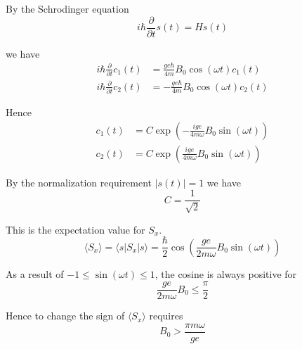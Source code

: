 By the Schrodinger equation
\begin{equation*}
i\hbar\frac{\partial}{\partial t}s(t)=Hs(t)
\end{equation*}

we have
\begin{align*}
i\hbar\frac{\partial}{\partial t}c_1(t)&=\frac{ge\hbar}{4m}B_0\cos(\omega t)c_1(t)
\\
i\hbar\frac{\partial}{\partial t}c_2(t)&=-\frac{ge\hbar}{4m}B_0\cos(\omega t)c_2(t)
\end{align*}

Hence
\begin{equation*}
\begin{aligned}
c_1(t)&=C\exp\left(-\frac{ige}{4m\omega}B_0\sin(\omega t)\right)
\\
c_2(t)&=C\exp\left(\frac{ige}{4m\omega}B_0\sin(\omega t)\right)
\end{aligned}
\tag{1}
\end{equation*}

By the normalization requirement $|s(t)|=1$ we have
\begin{equation*}
C=\frac{1}{\sqrt2}
\end{equation*}

This is the expectation value for $S_x$.
\begin{equation*}
\langle S_x\rangle=\langle s|S_x|s\rangle
=\frac{\hbar}{2}\cos\left(\frac{ge}{2m\omega}B_0\sin(\omega t)\right)
\tag{2}
\end{equation*}

As a result of $-1\le\sin(\omega t)\le1$, the cosine is always positive for
\begin{equation*}
\frac{ge}{2m\omega}B_0\le\frac{\pi}{2}
\end{equation*}

Hence to change the sign of $\langle S_x\rangle$ requires
\begin{equation*}
B_0>\frac{\pi m\omega}{ge}
\end{equation*}




